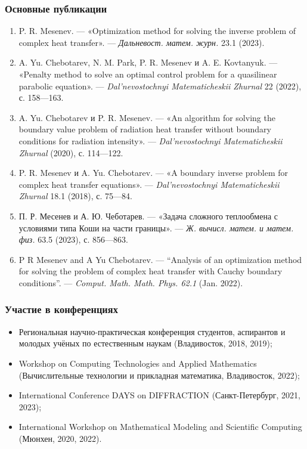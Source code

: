 \begin{frame} %
    \frametitle{Основные публикации}
    \small{
        \begin{enumerate}
            \item P. R. Mesenev. — «Optimization method for solving the inverse problem
            of complex heat transfer». —  \textit{Дальневост. матем. журн.} 23.1 (2023).
            \item A. Yu. Chebotarev, N. M. Park, P. R. Mesenev и A. E. Kovtanyuk. —
            «Penalty method to solve an optimal control problem for a quasilinear
            parabolic equation». —  \textit{Dal’nevostochnyi Matematicheskii Zhurnal} 22 (2022), с. 158—163.
            \item A. Yu. Chebotarev и P. R. Mesenev. — «An algorithm for solving
            the boundary value problem of radiation heat transfer without
            boundary conditions for radiation intensity». —  \textit{Dal’nevostochnyi
            Matematicheskii Zhurnal} (2020), с. 114—122.
            \item P. R. Mesenev и A. Yu. Chebotarev. — «A boundary inverse
            problem for complex heat transfer equations». — \textit{Dal’nevostochnyi
            Matematicheskii Zhurnal} 18.1 (2018), с. 75—84.
            \item П. Р. Месенев и А. Ю. Чеботарев. — «Задача сложного теплообмена с
            условиями типа Коши на части границы». — \textit{Ж. вычисл. матем. и матем. физ.}
            63.5 (2023), с. 856—863.
            \item P R Mesenev and A Yu Chebotarev. — “Analysis of an optimization
            method for solving the problem of complex heat transfer with Cauchy
            boundary conditions”. —  \textit{Comput. Math. Math. Phys. 62.1} (Jan. 2022).
        \end{enumerate}
    }
\end{frame}


\begin{frame}
    \frametitle{Участие в конференциях}
    \begin{itemize}
        \item Региональная научно-практическая конференция студентов, аспирантов
        и молодых учёных по естественным наукам (Владивосток, 2018, 2019);
        \item Workshop on Computing Technologies and Applied Mathematics
        (Вычислительные технологии и прикладная математика, Владивосток, 2022);
        \item International Conference DAYS on DIFFRACTION (Санкт-Петербург, 2021, 2023);
        \item International Workshop on Mathematical Modeling and Scientific Computing (Мюнхен, 2020, 2022).
    \end{itemize}
\end{frame}
